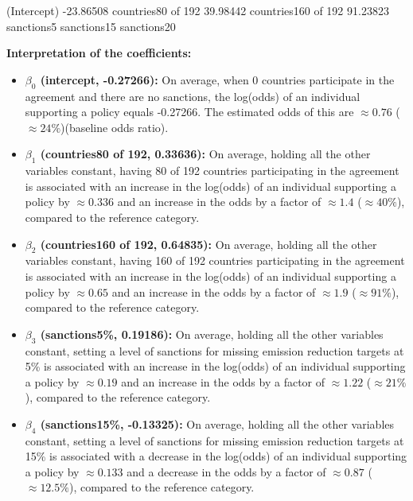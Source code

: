 \documentclass[12pt,letterpaper]{article}
\begin{document}
\begin{enumerate}
\begin{enumerate}
		
	 
	
	\begin{table}[htbp]
		\centering
		\begin{verbbox}
			(Intercept)        -23.86508
			countries80 of 192 39.98442
			countries160 of 192 91.23823
			sanctions5%
			sanctions15%
			sanctions20%
		\end{verbbox}
		\theverbbox
	\end{table}
	
\textbf{Interpretation of the coefficients:}

\begin{itemize}
	\item \textbf{\( \beta_0 \) (intercept, -0.27266):} On average, when 0 countries participate in the agreement and there are no sanctions, the log(odds) of an individual supporting a policy equals -0.27266. The estimated odds of this are $\approx 0.76$ ($\approx 24\%$)(baseline odds ratio).
	\item \textbf{ \( \beta_1 \) (countries80 of 192, 0.33636): }On average, holding all the other variables constant, having 80 of 192 countries participating in the agreement is associated with an increase in the log(odds) of an individual supporting a policy by $\approx 0.336$ and an increase in the odds by a factor of $\approx 1.4$ ($\approx 40\%$), compared to the reference category.
	\item \textbf{\( \beta_2 \) (countries160 of 192, 0.64835): }On average, holding all the other variables constant, having 160 of 192 countries participating in the agreement is associated with an increase in the log(odds) of an individual supporting a policy by $\approx 0.65$ and an increase in the odds by a factor of $\approx 1.9$ ($\approx 91\%$), compared to the reference category.
	\item \textbf{\( \beta_3 \) (sanctions5\%, 0.19186): }On average, holding all the other variables constant, setting a level of  sanctions for missing emission reduction targets at 5\% is associated with an increase in the log(odds) of an individual supporting a policy by $\approx 0.19$ and an increase in the odds by a factor of $\approx 1.22$ ($\approx 21\%$), compared to the reference category.
	\item \textbf{\( \beta_4 \) (sanctions15\%, -0.13325): }On average, holding all the other variables constant, setting a level of  sanctions for missing emission reduction targets at 15\% is associated with a decrease in the log(odds) of an individual supporting a policy by $\approx 0.133$ and a decrease in the odds by a factor of $\approx 0.87$ ($\approx 12.5\%$), compared to the reference category.

\end{itemize}
\end{enumerate}
\end{enumerate}
\end{document}
